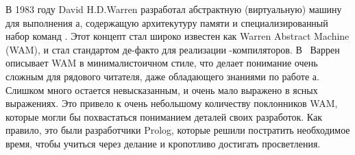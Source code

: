 
\secdown

В 1983 году David H.D.Warren разработал абстрактную (виртуальную) машину для
выполнения \prolog а, содержащую архитекутуру памяти и специализированный набор
команд \cite{War83}. Этот концепт стал широко известен как Warren Abstract
Machine (WAM), и стал стандартом де-факто для реализации \prolog-компиляторов.
В \cite{War83}\ Варрен описывает WAM в минималистоичном стиле, что делает
понимание очень сложным для рядового читателя, даже обладающего знаниями по
работе \prolog а. Слишком много остается невысказанным, и очень мало выражено в
ясных выражениях. Это привело к очень
небольшому количеству поклонников WAM, которые могли бы похвастаться пониманием
деталей своих разработок.  Как правило, это были разработчики Prolog, которые
решили постратить необходимое время, чтобы учиться через делание и кропотливо
достигать просветления.



\secup
